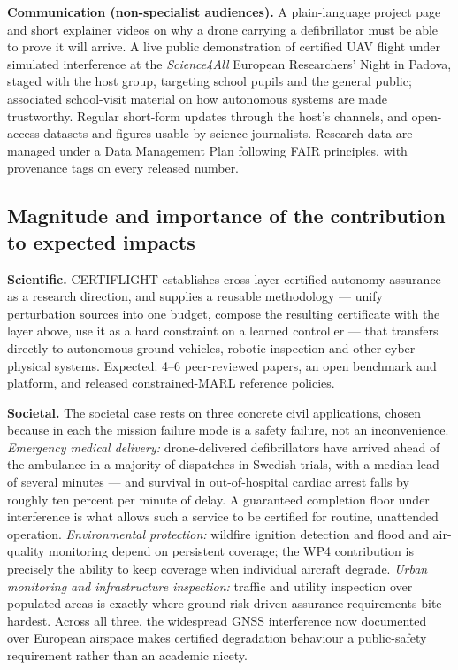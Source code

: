 \documentclass[11pt,a4paper]{article}
\begin{document}
\textbf{Communication (non-specialist audiences).} A plain-language project page and short explainer videos on why a drone carrying a defibrillator must be able to prove it will arrive. A live public demonstration of certified UAV flight under simulated interference at the \emph{Science4All} European Researchers' Night in Padova, staged with the host group, targeting school pupils and the general public; associated school-visit material on how autonomous systems are made trustworthy. Regular short-form updates through the host's channels, and open-access datasets and figures usable by science journalists. Research data are managed under a Data Management Plan following FAIR principles, with provenance tags on every released number.

\subsection{Magnitude and importance of the contribution to expected impacts}

\textbf{Scientific.} CERTIFLIGHT establishes cross-layer certified autonomy assurance as a research direction, and supplies a reusable methodology --- unify perturbation sources into one budget, compose the resulting certificate with the layer above, use it as a hard constraint on a learned controller --- that transfers directly to autonomous ground vehicles, robotic inspection and other cyber-physical systems. Expected: 4--6 peer-reviewed papers, an open benchmark and platform, and released constrained-MARL reference policies.

\textbf{Societal.} The societal case rests on three concrete civil applications, chosen because in each the mission failure mode is a safety failure, not an inconvenience. \emph{Emergency medical delivery:} drone-delivered defibrillators have arrived ahead of the ambulance in a majority of dispatches in Swedish trials, with a median lead of several minutes --- and survival in out-of-hospital cardiac arrest falls by roughly ten percent per minute of delay. A guaranteed completion floor under interference is what allows such a service to be certified for routine, unattended operation. \emph{Environmental protection:} wildfire ignition detection and flood and air-quality monitoring depend on persistent coverage; the WP4 contribution is precisely the ability to keep coverage when individual aircraft degrade. \emph{Urban monitoring and infrastructure inspection:} traffic and utility inspection over populated areas is exactly where ground-risk-driven assurance requirements bite hardest. Across all three, the widespread GNSS interference now documented over European airspace makes certified degradation behaviour a public-safety requirement rather than an academic nicety.
\end{document}
